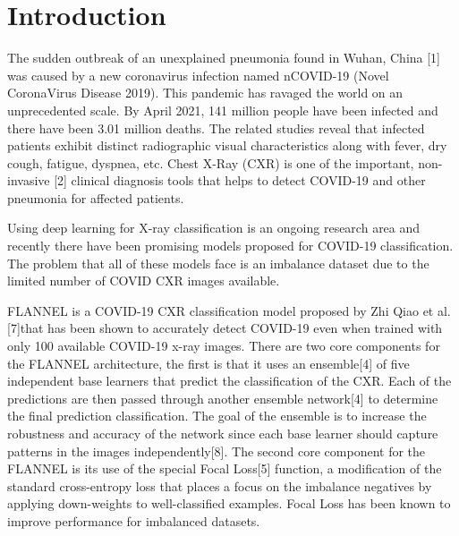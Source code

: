 \documentclass{sigkddExp}
\begin{document}
\section{Introduction}
The sudden outbreak of an unexplained pneumonia found in Wuhan, China [1] was
caused by a new coronavirus infection named nCOVID-19 (Novel CoronaVirus Disease
2019). This pandemic has ravaged the world on an unprecedented scale. By April
2021, 141 million people have been infected and there have been 3.01 million
deaths. The related studies reveal that infected patients exhibit distinct
radiographic visual characteristics along with fever, dry cough, fatigue,
dyspnea, etc. Chest X-Ray (CXR) is one of the important, non-invasive [2]
clinical diagnosis tools that helps to detect COVID-19 and other pneumonia for
affected patients.

Using deep learning for X-ray classification is an ongoing research area and
recently there have been promising models proposed for COVID-19 classification.
The problem that all of these models face is an imbalance dataset due to the
limited number of COVID CXR images available.

FLANNEL is a COVID-19 CXR classification model proposed by Zhi Qiao et al.
    [7]that has been shown to accurately detect COVID-19 even when trained with only
100 available COVID-19 x-ray images. There are two core components for the
FLANNEL architecture, the first is that it uses an ensemble[4] of five
independent base learners that predict the classification of the CXR. Each of
the predictions are then passed through another ensemble network[4] to determine
the final prediction classification. The goal of the ensemble is to increase the
robustness and accuracy of the network since each base learner should capture
patterns in the images independently[8]. The second core component for the
FLANNEL is its use of the special Focal Loss[5] function, a modification of the
standard cross-entropy loss that places a focus on the imbalance negatives by
applying down-weights to well-classified examples. Focal Loss has been known to
improve performance for imbalanced datasets.
\end{document}
